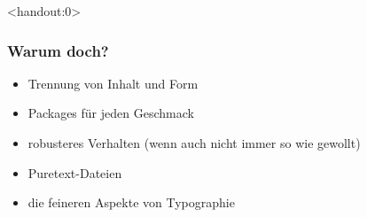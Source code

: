 \documentclass{beamer}                %
\begin{document}
\begin{frame}<handout:0>
    \frametitle{Warum doch?}
    \begin{itemize}
        \item
            Trennung von Inhalt und Form 
        \item
            Packages f\"ur jeden Geschmack
        \item
            robusteres Verhalten (wenn auch nicht immer so wie gewollt)
        \item
            Puretext-Dateien
        \item
            die feineren Aspekte von Typographie
    \end{itemize}
\end{frame}

\end{document}
